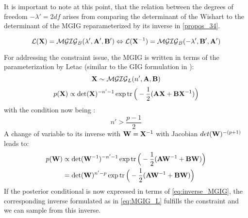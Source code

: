 It is important to note at this point, that the relation between the degrees of freedom $-\lambda' = 2df$ arises from comparing the determinant of the Wishart to the determinant of the MGIG reparameterized by its inverse in \autoref{propos_34}.
\begin{tcolorbox}[colback=yellow!5!white,colframe=yellow!75!black]
	\begin{propos_34but}
		\begin{equation}
			\label{propos_34}
			\mathcal{L}(\mathbf{X}) = \mathcal{MGIG}_B(\lambda', \mathbf{A}', \mathbf{B}') 
			\Leftrightarrow 
			\mathcal{L}(\mathbf{X}^{-1}) = \mathcal{MGIG}_B(-\lambda', \mathbf{B}', \mathbf{A}')
		\end{equation}
	\end{propos_34but}
\end{tcolorbox}

For addressing the constraint issue, the MGIG is written in terms of the parameterization by Letac (similar to the \gls{GIG} formulation in \cite{letac1983characterization}):
\begin{equation*}
	\mathbf{X} \sim \mathcal{MGIG}_{L}(n', \mathbf{A}, \mathbf{B}) 
\end{equation*}
\begin{equation}
	\label{eq:MGIG_L}
	p(\mathbf{X}) \propto \det(\mathbf{X})^{-n' - 1}
	\exp \operatorname{tr}
	\Big(
	-\frac{1}{2} (\mathbf{A}\mathbf{X} + \mathbf{B} \mathbf{X}^{-1} )
	\Big)
\end{equation}
with the condition now being \cite[Appendix 4]{kaufmann2017semi}:
$$
n'>\frac{p-1}{2}
$$
A change of variable to its inverse with $\mathbf{W}=\mathbf{X}^{-1}$ with Jacobian $det(\mathbf{W})^{-(p+1)}$ 
leads to:
\begin{align}
	p(\mathbf{W}) & \propto \det(\mathbf{W}^{-1})^{-n' - 1} 
	\exp \operatorname{tr}
	\Big(
	-\frac{1}{2} (\mathbf{A}\mathbf{W}^{-1} + \mathbf{B} \mathbf{W} )
	\Big)
	\nonumber
	\\
	            & = \det(\mathbf{W})^{n'-p}               
	\exp \operatorname{tr}
	\Big(
	-\frac{1}{2} (\mathbf{A}\mathbf{W}^{-1} + \mathbf{B} \mathbf{W} )
	\Big)
	\label{eq:inverse_MGIG}
\end{align}
If the posterior conditional is now expressed in terms of \autoref{eq:inverse_MGIG},
the corresponding inverse formulated as in \autoref{eq:MGIG_L} fulfills the constraint
and we can sample from this inverse.

